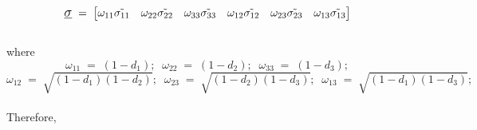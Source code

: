 \documentclass[12pt,a4paper,twoside,openright]{report}
\begin{document}
$$
\mathlarger{ \underline{\sigma} } \; = \; 
\begin{bmatrix}
\mathlarger{\omega_{11}\tilde{\sigma_{11}}}  & \mathlarger{ \omega_{22}\tilde{\sigma_{22}}} & \mathlarger{\omega_{33}\tilde{\sigma_{33}}}  & \mathlarger{\omega_{12}\tilde{\sigma_{12}}} & \mathlarger{\omega_{23}\tilde{\sigma_{23}}}  & \mathlarger{\omega_{13}\tilde{\sigma_{13}}} \\
 \end{bmatrix}
$$
\\
where
$$\omega_{11} \; = \; (1 - d_{1}); \;\;  \omega_{22} \; = \; (1 - d_{2}); \;\; \omega_{33} \; = \; (1 - d_{3});$$ \vspace*{0.01cm} $$\omega_{12} \; = \; \sqrt{(1 - d_{1})(1 - d_{2})};  \;\;\omega_{23} \; = \; \sqrt{(1 - d_{2})(1 - d_{3})}; \;\; \omega_{13} \; = \; \sqrt{(1 - d_{1})(1 - d_{3})};$$\\
Therefore,
\end{document}
